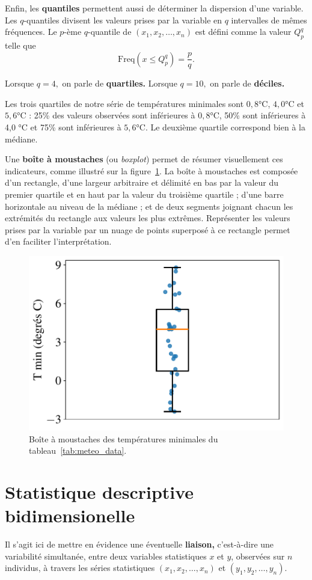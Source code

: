 Enfin, les \textbf{quantiles} permettent aussi de déterminer la dispersion
d'une variable. Les $q$-quantiles divisent les valeurs prises par la variable
en $q$ intervalles de mêmes fréquences. Le $p$-ème $q$-quantile de
$(x_1, x_2, \dots, x_n)$ est défini comme la valeur $Q_p^q$ telle que 
\[\text{Freq}(x \leq Q_p^q) = \frac{p}{q}.\]

Lorsque $q=4,$ on parle de \textbf{quartiles.} Lorsque $q=10,$ on parle de
\textbf{déciles.}

\begin{exemple}
	Les trois quartiles de notre série de températures minimales sont
	$0,8 \si{\celsius}$, $4,0 \si{\celsius}$ et $5,6 \si{\celsius}$ : 25\% des
	valeurs observées sont inférieures à $0,8 \si{\celsius}$, 50\% sont inférieures
	à 4,0 \si{\celsius} et 75\% sont inférieures à $5,6 \si{\celsius}$. Le deuxième
	quartile correspond bien à la médiane.
\end{exemple}

Une \textbf{boîte à moustaches} (ou \textit{boxplot}) permet de résumer
visuellement ces indicateurs, comme illustré sur la
figure~\ref{fig:meteo_tmin_boxplot}. La boîte à moustaches est composée d'un
rectangle, d'une largeur arbitraire et délimité en bas par la valeur du premier
quartile et en haut par la valeur du troisième quartile ; d'une barre
horizontale au niveau de la médiane ; et de deux segments joignant chacun les
extrémités du rectangle aux valeurs les plus extrêmes. Représenter les valeurs
prises par la variable par un nuage de points superposé à ce rectangle permet
d'en faciliter l'interprétation.

\begin{figure}[h]
	\centering
	\includegraphics[width=.5\textwidth]{figures/stats/meteo_tmin_boxplot}
	\caption{Boîte à moustaches des températures minimales du
		tableau~\ref{tab:meteo_data}.}
	\label{fig:meteo_tmin_boxplot}
\end{figure}

\section{Statistique descriptive bidimensionelle}
Il s'agit ici de mettre en évidence une éventuelle \textbf{liaison,}
c'est-à-dire une variabilité simultanée, entre deux variables statistiques $x$
et $y$, observées sur $n$ individus, à travers les séries statistiques
$(x_1, x_2, \dots, x_n)$ et $(y_1, y_2, \dots, y_n).$

